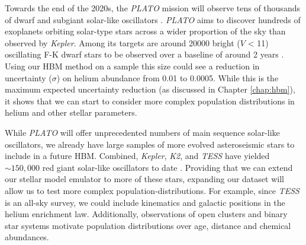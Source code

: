 
Towards the end of the 2020s, the \emph{PLATO} mission will observe tens of thousands of dwarf and subgiant solar-like oscillators \citep{Rauer.Catala.ea2014}. \emph{PLATO} aims to discover hundreds of exoplanets orbiting solar-type stars across a wider proportion of the sky than observed by \emph{Kepler}. Among its targets are around \num{20000} bright (\(V\) < 11) oscillating F-K dwarf stars to be observed over a baseline of around 2 years \citep{Goupil2017}. Using our HBM method on a sample this size could see a reduction in uncertainty (\(\sigma\)) on helium abundance from 0.01 to 0.0005. While this is the maximum expected uncertainty reduction (as discussed in Chapter \ref{chap:hbm}), it shows that we can start to consider more complex population distributions in helium and other stellar parameters.

While \emph{PLATO} will offer unprecedented numbers of main sequence solar-like oscillators, we already have large samples of more evolved asteroseismic stars to include in a future HBM. Combined, \emph{Kepler}, \emph{K2}, and \emph{TESS} have yielded \(\sim 150,000\) red giant solar-like oscillators to date \citep{Hon.Huber.ea2021,Yu.Huber.ea2018}. Providing that we can extend our stellar model emulator to more of these stars, expanding our dataset will allow us to test more complex population-distributions. For example, since \emph{TESS} is an all-sky survey, we could include kinematics and galactic positions in the helium enrichment law. Additionally, observations of open clusters and binary star systems motivate population distributions over age, distance and chemical abundances.


